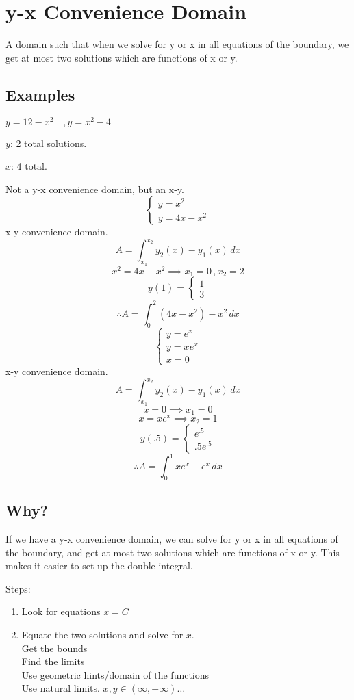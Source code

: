 \section{y-x Convenience Domain}
A domain such that when we solve for y or x in all equations of the boundary, we get at most two solutions which are functions of x or y. 

\subsection{Examples}
$y = 12 - x^2\quad , y = x^2 - 4$

$y$: 2 total solutions.

$x$: 4 total.

Not a y-x convenience domain, but an x-y.
\[
\begin{cases}
    y = x^2 \\ 
    y = 4x-x^2 
\end{cases}
\]
x-y convenience domain.
\[
    A = \int_{x_1}^{x_2} y_2(x) - y_1(x) \,dx
\]
\[
    x^2 = 4x - x^2 \implies x_1 = 0\, , x_2 = 2
\]
\[
    y(1) = \begin{cases}
        1\\
        3
    \end{cases}
\]
\[
    \therefore A = \int_{0}^{2} (4x - x^2) - x^2 \,dx
\]
\[
\begin{cases}
    y = e^x \\
    y = xe^x \\
    x = 0 
\end{cases}
\]
x-y convenience domain.
\[
    A = \int_{x_1}^{x_2} y_2(x) - y_1(x) \,dx
\]
\[
    x = 0 \implies x_1 = 0
\]
\[
    x = xe^x \implies x_2 = 1
\]
\[
    y(.5) = \begin{cases}
          e^{.5} \\
        .5e^{.5}
    \end{cases}
\]
\[
    \therefore A = \int_{0}^{1} xe^x - e^x \,dx
\]
\subsection{Why?}
If we have a y-x convenience domain, we can solve for y or x in all equations of the boundary, and get at most two solutions which are functions of x or y. This makes it easier to set up the double integral.

Steps:

\begin{enumerate}
    \item Look for equations $x = C$
    \item Equate the two solutions and solve for $x$. \\
        Get the bounds\\
        Find the limits\\
        Use geometric hints/domain of the functions\\
        Use natural limits. $x, y \in (\infty, -\infty)\dots$
\end{enumerate}
